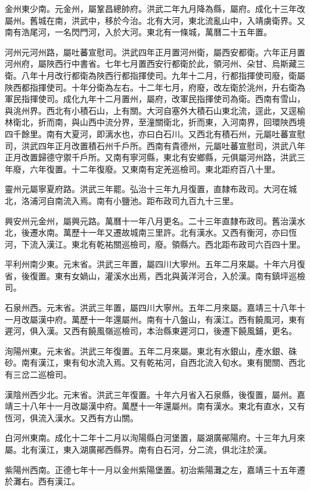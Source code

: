 金州東少南。元金州，屬鞏昌總帥府。洪武二年九月降為縣，屬府。成化十三年改屬州。舊城在南，洪武中，移於今治。北有大河，東北流亂山中，入靖虜衛界。又南有浩尾河，一名閃門河，入於大河。東北有一條城，萬曆二十五年置。

河州元河州路，屬吐蕃宣慰司。洪武四年正月置河州衛，屬西安都衛。六年正月置河州府，屬陜西行中書省。七年七月置西安行都衛於此，領河州、朵甘、烏斯藏三衛。八年十月改行都衛為陜西行都指揮使司。九年十二月，行都指揮使司廢，衛屬陜西都指揮使司。十年分衛為左右。十二年七月，府廢，改左衛於洮州，升右衛為軍民指揮使司。成化九年十二月置州，屬府，改軍民指揮使司為衛。西南有雪山，與洮州界。西北有小積石山，上有關。大河自塞外大積石山東北流，逕此，又逕榆林衛北，折而南，與山西中流分界，至潼關衛北，折而東，入河南界，回環陜西境四千餘里。南有大夏河，即漓水也，亦曰白石川。又西北有積石州，元屬吐蕃宣慰司，洪武四年正月改置積石州千戶所。西南有貴德州，元屬吐蕃宣慰司，洪武八年正月改置歸德守禦千戶所。又南有寧河縣，東北有安鄉縣，元俱屬河州路，洪武三年廢，六年復置。十二年復廢。又東南有定羌巡檢司。東北距府百八十里。

靈州元屬寧夏府路。洪武三年罷。弘治十三年九月復置，直隸布政司。大河在城北，洛浦河自南流入焉。南有小鹽池。距布政司九百九十三里。

興安州元金州，屬興元路。萬曆十一年八月更名。二十三年直隸布政司。舊治漢水北，後遷水南。萬歷十一年又遷故城南三里許。北有漢水。又西有衡河，亦曰恆河，下流入漢江。東北有乾祐關巡檢司，廢。領縣六。西北距布政司六百四十里。

平利州南少東。元末省。洪武三年置，屬四川大寧州。五年二月來屬。十年六月復省，後復置。東有女媧山，灌溪水出焉，西北與黃洋河合，入於漢。南有鎮坪巡檢司。

石泉州西。元末省。洪武三年置，屬四川大寧州。五年二月來屬。嘉靖三十八年十一月改屬漢中府。萬歷十一年還屬州。南有十八盤山，有漢江。西有饒風河，東有遲河，俱入漢。又西有饒風嶺巡檢司，本治縣東遲河口，後遷下饒風鋪，更名。

洵陽州東。元末省。洪武三年復置。五年二月來屬。東北有水銀山，產水銀、硃砂。南有漢江，東有旬水流入焉。又有乾祐河，自西北流入旬水。東有閭關、西北有三岔二巡檢司。

漢陰州西少北。元末省。洪武三年復置。十年六月省入石泉縣，後復置，屬州。嘉靖三十八年十一月改屬漢中府。萬歷十一年還屬州。南有漢水。東北有直水，又有恆河，俱流入漢水。又西有方山關。

白河州東南。成化十二年十二月以洵陽縣白河堡置，屬湖廣鄖陽府。十三年九月來屬。北有漢江，東入湖廣鄖西縣界。南有白石河，分二流，俱北注於漢。

紫陽州西南。正德七年十一月以金州紫陽堡置。初治紫陽灘之左，嘉靖三十五年遷於灘右。西有漢江。

